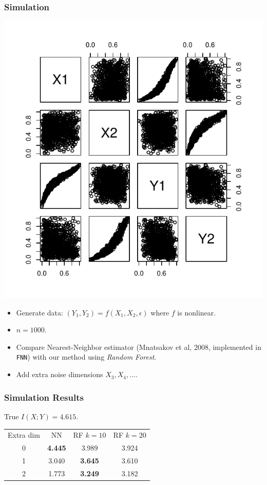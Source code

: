 \documentclass{beamer}
\begin{document}
\begin{frame}
\frametitle{Simulation}


\begin{center}
\includegraphics[scale = 0.34]{../idloss/sim1_pairs.pdf}
\end{center}
\begin{itemize}
\item Generate data: $(Y_1, Y_2) = f(X_1, X_2, \epsilon)$ where $f$ is nonlinear.
\item $n = 1000$.
\item Compare Nearest-Neighbor estimator (Mnatsakov et al, 2008, implemented in {\tt FNN}) with our method using \emph{Random Forest}.
\item Add extra noise dimensions $X_3, X_4, \hdots$.
\end{itemize}


\end{frame}

\begin{frame}
\frametitle{Simulation Results}

True $I(X; Y) = 4.615$.

\begin{center}
\begin{tabular}{c||c|c|c}
Extra dim & NN & RF $k = 10$ & RF $k=20$\\
0 & \textbf{4.445} & 3.989 & 3.924\\
1 & 3.040 & \textbf{3.645} & 3.610\\
2 & 1.773 & \textbf{3.249} & 3.182
\end{tabular}
\end{center}


\end{frame}
\end{document}
